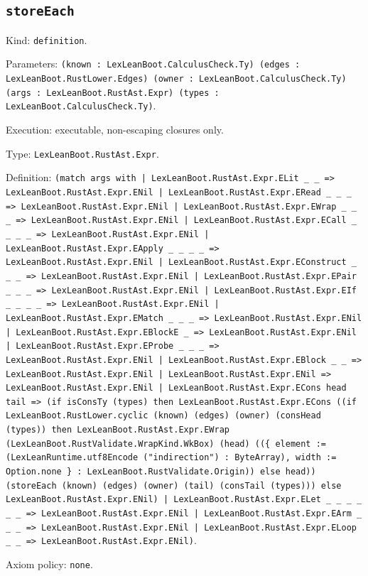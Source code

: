 \documentclass[11pt]{article}
\begin{document}
\subsection*{\texttt{storeEach}}
\noindent Kind: \texttt{definition}.\par
\noindent Parameters: \texttt{(known : LexLeanBoot.CalculusCheck.Ty) (edges : LexLeanBoot.RustLower.Edges) (owner : LexLeanBoot.CalculusCheck.Ty) (args : LexLeanBoot.RustAst.Expr) (types : LexLeanBoot.CalculusCheck.Ty)}.\par
\noindent Execution: executable, non-escaping closures only.\par
\noindent Type: \texttt{LexLeanBoot.RustAst.Expr}.\par
\noindent Definition: \texttt{(match args with | LexLeanBoot.RustAst.Expr.ELit \_ \_ => LexLeanBoot.RustAst.Expr.ENil | LexLeanBoot.RustAst.Expr.ERead \_ \_ \_ => LexLeanBoot.RustAst.Expr.ENil | LexLeanBoot.RustAst.Expr.EWrap \_ \_ \_ => LexLeanBoot.RustAst.Expr.ENil | LexLeanBoot.RustAst.Expr.ECall \_ \_ \_ \_ => LexLeanBoot.RustAst.Expr.ENil | LexLeanBoot.RustAst.Expr.EApply \_ \_ \_ \_ => LexLeanBoot.RustAst.Expr.ENil | LexLeanBoot.RustAst.Expr.EConstruct \_ \_ \_ => LexLeanBoot.RustAst.Expr.ENil | LexLeanBoot.RustAst.Expr.EPair \_ \_ \_ => LexLeanBoot.RustAst.Expr.ENil | LexLeanBoot.RustAst.Expr.EIf \_ \_ \_ \_ => LexLeanBoot.RustAst.Expr.ENil | LexLeanBoot.RustAst.Expr.EMatch \_ \_ \_ => LexLeanBoot.RustAst.Expr.ENil | LexLeanBoot.RustAst.Expr.EBlockE \_ => LexLeanBoot.RustAst.Expr.ENil | LexLeanBoot.RustAst.Expr.EProbe \_ \_ \_ => LexLeanBoot.RustAst.Expr.ENil | LexLeanBoot.RustAst.Expr.EBlock \_ \_ => LexLeanBoot.RustAst.Expr.ENil | LexLeanBoot.RustAst.Expr.ENil => LexLeanBoot.RustAst.Expr.ENil | LexLeanBoot.RustAst.Expr.ECons head tail => (if isConsTy (types) then LexLeanBoot.RustAst.Expr.ECons ((if LexLeanBoot.RustLower.cyclic (known) (edges) (owner) (consHead (types)) then LexLeanBoot.RustAst.Expr.EWrap (LexLeanBoot.RustValidate.WrapKind.WkBox) (head) ((\{ element := (LexLeanRuntime.utf8Encode ("indirection") : ByteArray), width := Option.none \} : LexLeanBoot.RustValidate.Origin)) else head)) (storeEach (known) (edges) (owner) (tail) (consTail (types))) else LexLeanBoot.RustAst.Expr.ENil) | LexLeanBoot.RustAst.Expr.ELet \_ \_ \_ \_ \_ \_ => LexLeanBoot.RustAst.Expr.ENil | LexLeanBoot.RustAst.Expr.EArm \_ \_ \_ => LexLeanBoot.RustAst.Expr.ENil | LexLeanBoot.RustAst.Expr.ELoop \_ \_ => LexLeanBoot.RustAst.Expr.ENil)}.\par
\noindent Axiom policy: \texttt{none}.\par
\end{document}
